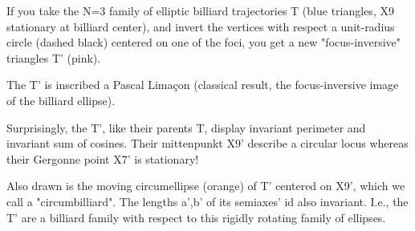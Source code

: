 If you take the N=3 family of elliptic billiard trajectories T (blue triangles, X9 stationary at billiard center), and invert the vertices with respect a unit-radius circle (dashed black) centered on one of the foci, you get a new "focus-inversive" triangles T' (pink). 

The T' is inscribed a Pascal Limaçon (classical result, the focus-inversive image of the billiard ellipse).

Surprisingly,  the T', like their parents T, display invariant perimeter and invariant sum of cosines. Their mittenpunkt X9' describe a circular locus whereas their Gergonne point X7' is stationary!

Also drawn is the moving circumellipse (orange) of T' centered on X9', which we call a "circumbilliard". The lengths a',b' of its semiaxes' id also invariant. I.e., the T' are a billiard family with respect to this rigidly rotating family of ellipses.
